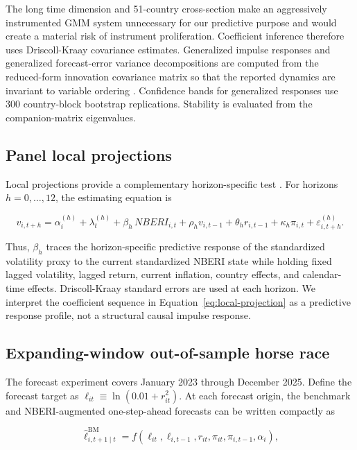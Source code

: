 \documentclass[11pt]{article}
\begin{document}
The long time dimension and 51-country cross-section make an
aggressively instrumented GMM system unnecessary for our predictive
purpose and would create a material risk of instrument proliferation.
Coefficient inference therefore uses
Driscoll-Kraay covariance estimates. Generalized impulse responses and
generalized forecast-error variance decompositions are computed from the
reduced-form innovation covariance matrix so that the reported dynamics
are invariant to variable ordering \citep{pesaran1998}. Confidence
bands for generalized responses use 300 country-block bootstrap
replications. Stability is evaluated from the companion-matrix
eigenvalues.

\subsection{Panel local projections}\label{panel-local-projections}

Local projections provide a complementary horizon-specific test \citep{jorda2005}. For horizons $h=0,\ldots,12$, the estimating equation is

\begin{equation}
\label{eq:local-projection}
v_{i,t+h}
=\alpha_i^{(h)}+\lambda_t^{(h)}+\beta_h\,NBERI_{i,t}
+\rho_h v_{i,t-1}+\theta_h r_{i,t-1}+\kappa_h\pi_{i,t}
+\varepsilon_{i,t+h}^{(h)}.
\end{equation}

Thus, $\beta_h$ traces the horizon-specific predictive response of the standardized volatility proxy to the current standardized NBERI state while holding fixed lagged volatility, lagged return, current inflation, country effects, and calendar-time effects. Driscoll-Kraay standard errors are used at each horizon. We interpret the coefficient sequence in Equation~\eqref{eq:local-projection} as a predictive response profile, not a structural causal impulse response.

\subsection{Expanding-window out-of-sample horse
race}\label{expanding-window-out-of-sample-horse-race}

The forecast experiment covers January 2023 through December 2025. Define the forecast target as $\ell_{it}\equiv\ln(0.01+r_{it}^{2})$. At each forecast origin, the benchmark and NBERI-augmented one-step-ahead forecasts can be written compactly as

\begin{equation}
\label{eq:forecast-benchmark}
\widehat{\ell}^{\mathrm{BM}}_{i,t+1\mid t}
=f\!\left(\ell_{it},\ell_{i,t-1},r_{it},\pi_{it},\pi_{i,t-1},\alpha_i\right),
\end{equation}
\end{document}
